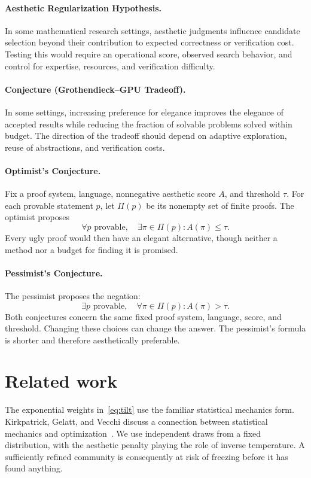 \documentclass[11pt]{article}
\theoremstyle{remark}
\begin{document}
\paragraph{Aesthetic Regularization Hypothesis.}
In some mathematical research settings, aesthetic judgments influence
candidate selection beyond their contribution to expected correctness or
verification cost. Testing this would require an operational score,
observed search behavior, and control for expertise, resources, and
verification difficulty.

\paragraph{Conjecture (Grothendieck--GPU Tradeoff).}
In some settings, increasing preference for elegance improves the elegance
of accepted results while reducing the fraction of solvable problems
solved within budget. The direction of the tradeoff should depend on
adaptive exploration, reuse of abstractions, and verification costs.

\paragraph{Optimist's Conjecture.}
Fix a proof system, language, nonnegative aesthetic score $A$, and threshold
$\tau$. For each provable statement $p$, let $\Pi(p)$ be its nonempty set
of finite proofs. The optimist proposes
\[
 \forall p\text{ provable},\quad
 \exists\pi\in\Pi(p): A(\pi)\leq\tau.
\]
Every ugly proof would then have an elegant alternative, though neither a
method nor a budget for finding it is promised.

\paragraph{Pessimist's Conjecture.}
The pessimist proposes the negation:
\[
 \exists p\text{ provable},\quad
 \forall\pi\in\Pi(p): A(\pi)>\tau.
\]
Both conjectures concern the same fixed proof system, language, score, and
threshold. Changing these choices can change the answer. The pessimist's
formula is shorter and therefore aesthetically preferable.

\section{Related work}

The exponential weights in~\eqref{eq:tilt} use the familiar statistical
mechanics form. Kirkpatrick, Gelatt, and Vecchi discuss a connection between
statistical mechanics and optimization~\cite{kirkpatrick1983}. We use
independent draws from a fixed distribution, with the aesthetic penalty
playing the role of inverse temperature. A sufficiently refined community
is consequently at risk of freezing before it has found anything.
\end{document}
